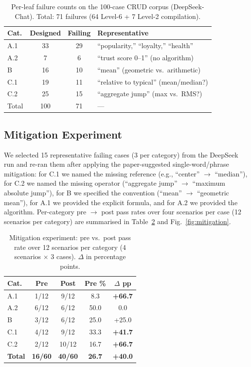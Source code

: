 \documentclass[conference]{IEEEtran}
\begin{document}
\begin{table}[t]
\centering
\caption{Per-leaf failure counts on the 100-case CRUD corpus (DeepSeek-Chat). Total: 71 failures (64 Level-6 + 7 Level-2 compilation).}
\label{tab:crud}
\scriptsize
\setlength{\tabcolsep}{4pt}
\begin{tabular}{lccl}
\toprule
Cat. & Designed & Failing & Representative \\
\midrule
A.1 & 33 & 29 & ``popularity,'' ``loyalty,'' ``health'' \\
A.2 & 7  & 6  & ``trust score 0--1'' (no algorithm) \\
B   & 16 & 10 & ``mean'' (geometric vs.\ arithmetic) \\
C.1 & 19 & 11 & ``relative to typical'' (mean/median?) \\
C.2 & 25 & 15 & ``aggregate jump'' (max vs.\ RMS?) \\
\midrule
Total & 100 & 71 & --- \\
\bottomrule
\end{tabular}
\end{table}

\subsection{Mitigation Experiment}
\label{sec:mitigation}
We selected 15 representative failing cases (3 per category) from the DeepSeek run and re-ran them after applying the paper-suggested single-word/phrase mitigation: for C.1 we named the missing reference (e.g., ``center'' $\rightarrow$ ``median''), for C.2 we named the missing operator (``aggregate jump'' $\rightarrow$ ``maximum absolute jump''), for B we specified the convention (``mean'' $\rightarrow$ ``geometric mean''), for A.1 we provided the explicit formula, and for A.2 we provided the algorithm. Per-category pre $\rightarrow$ post pass rates over four scenarios per case (12 scenarios per category) are summarised in Table~\ref{tab:mitigation} and Fig.~\ref{fig:mitigation}.

\begin{table}[t]
\centering
\caption{Mitigation experiment: pre vs.\ post pass rate over 12 scenarios per category (4 scenarios $\times$ 3 cases). $\Delta$ in percentage points.}
\label{tab:mitigation}
\small
\begin{tabular}{lcccc}
\toprule
Cat. & Pre & Post & Pre \% & $\Delta$ pp \\
\midrule
A.1 & 1/12 &  9/12 &  8.3 & \textbf{+66.7} \\
A.2 & 6/12 &  6/12 & 50.0 & \phantom{+}0.0 \\
B   & 3/12 &  6/12 & 25.0 & +25.0 \\
C.1 & 4/12 &  9/12 & 33.3 & \textbf{+41.7} \\
C.2 & 2/12 & 10/12 & 16.7 & \textbf{+66.7} \\
\midrule
\textbf{Total} & \textbf{16/60} & \textbf{40/60} & \textbf{26.7} & \textbf{+40.0} \\
\bottomrule
\end{tabular}
\end{table}
\end{document}
